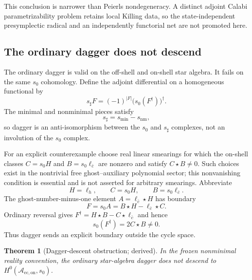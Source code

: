 \documentclass[11pt]{article}
\newtheorem{theorem}{Theorem}[section]
\theoremstyle{definition}
\theoremstyle{remark}
\newcommand{\cbar}{\bar c}
\newcommand{\cA}{\mathcal A}
\begin{document}
This conclusion is narrower than Peierls nondegeneracy.  A distinct adjoint Calabi
parametrizability problem retains local Killing data, so the state-independent
presymplectic radical and an independently functorial net are not promoted here.

\subsection{The ordinary dagger does not descend}

The ordinary dagger is valid on the off-shell and on-shell star algebra.  It fails on
the same $s_0$ cohomology.  Define the adjoint differential on a homogeneous functional
by
\begin{equation}
 s_\sharp F=(-1)^{|F|}\bigl(s_0(F^\dagger)\bigr)^\dagger.
\end{equation}
The minimal and nonminimal pieces satisfy
\begin{equation}
 s_\sharp=s_{\min}-s_{\mathrm{nm}},
\end{equation}
so dagger is an anti-isomorphism between the $s_0$ and $s_\sharp$ complexes, not an
involution of the $s_0$ complex.

For an explicit counterexample choose real linear smearings for which the on-shell
classes $C=s_0H$ and $B=s_0\ell_{\cbar}$ are nonzero and satisfy
$C\star B\neq0$.  Such choices exist in the nontrivial free ghost--auxiliary
polynomial sector; this nonvanishing condition is essential and is not asserted for
arbitrary smearings.  Abbreviate
\begin{equation}
 H=\ell_h,
 \qquad C=s_0H,
 \qquad B=s_0\ell_{\cbar}.
\end{equation}
The ghost-number-minus-one element $A=\ell_{\cbar}\star H$ has boundary
\begin{equation}
 F=s_0A=B\star H-\ell_{\cbar}\star C.
\end{equation}
Ordinary reversal gives $F^\dagger=H\star B-C\star\ell_{\cbar}$ and hence
\begin{equation}
 s_0(F^\dagger)=2C\star B\neq0.
 \label{eq:daggercounter}
\end{equation}
Thus dagger sends an explicit boundary outside the cycle space.

\begin{theorem}[Dagger-descent obstruction; derived]
In the frozen nonminimal reality convention, the ordinary star-algebra dagger does not
descend to $H^0(\cA_{\mathrm{ec,on}},s_0)$.
\end{theorem}
\end{document}
